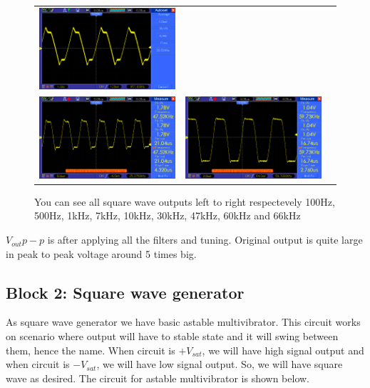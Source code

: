\documentclass[14pt,a4paper]{extarticle}
\begin{document}
\begin{figure}[H]
\begin{tabular}{ccc}
    \includegraphics[width=.49\linewidth]{imgs/square30k.png}\\
    \includegraphics[width=.49\linewidth]{imgs/square47k.png}&
    \includegraphics[width=.49\linewidth]{imgs/square60k.png}
\end{tabular}
\vspace{0.2cm}
\caption{You can see all square wave outputs left to right respectevely 100Hz, 500Hz, 1kHz, 7kHz, 10kHz, 30kHz, 47kHz, 60kHz and 66kHz}
\label{fig:filters}
\end{figure}

\(V_{out}{p-p}\) is after applying all the filters and tuning. Original output is quite large in peak to peak voltage around 5 times big.




\subsection{Block 2: Square wave generator}
\label{sec:org0dd8575}

As square wave generator we have basic astable multivibrator. This circuit works on scenario where output will have to stable state and it will swing between them, hence the name. When circuit is \(+V_{sat}\), we will have high signal output and when circuit is \(-V_{sat}\), we will have low signal output. So, we will have square wave as desired. The circuit for astable multivibrator is shown below.
\end{document}
